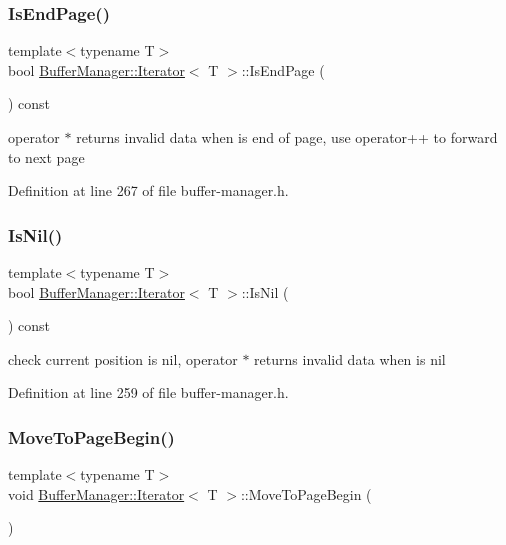 \subsubsection{\texorpdfstring{IsEndPage()}{IsEndPage()}}
{\footnotesize\ttfamily template$<$typename T$>$ \\
bool \mbox{\hyperlink{class_buffer_manager_1_1_iterator}{Buffer\+Manager\+::\+Iterator}}$<$ T $>$\+::Is\+End\+Page (\begin{DoxyParamCaption}{ }\end{DoxyParamCaption}) const\hspace{0.3cm}{\ttfamily [inline]}}

{\ttfamily operator $\ast$} returns invalid data when is end of page, use {\ttfamily operator++} to forward to next page 

Definition at line 267 of file buffer-\/manager.\+h.

\mbox{\label{class_buffer_manager_1_1_iterator_ad19030c51bf30e6d6e9e2e560cc511c4}} 
\subsubsection{\texorpdfstring{IsNil()}{IsNil()}}
{\footnotesize\ttfamily template$<$typename T$>$ \\
bool \mbox{\hyperlink{class_buffer_manager_1_1_iterator}{Buffer\+Manager\+::\+Iterator}}$<$ T $>$\+::Is\+Nil (\begin{DoxyParamCaption}{ }\end{DoxyParamCaption}) const\hspace{0.3cm}{\ttfamily [inline]}}

check current position is nil, {\ttfamily operator $\ast$} returns invalid data when is nil 

Definition at line 259 of file buffer-\/manager.\+h.

\mbox{\label{class_buffer_manager_1_1_iterator_a5fcb5fb10746e3d58736959a12610dd0}} 
\subsubsection{\texorpdfstring{MoveToPageBegin()}{MoveToPageBegin()}}
{\footnotesize\ttfamily template$<$typename T$>$ \\
void \mbox{\hyperlink{class_buffer_manager_1_1_iterator}{Buffer\+Manager\+::\+Iterator}}$<$ T $>$\+::Move\+To\+Page\+Begin (\begin{DoxyParamCaption}{ }\end{DoxyParamCaption})\hspace{0.3cm}{\ttfamily [inline]}}

